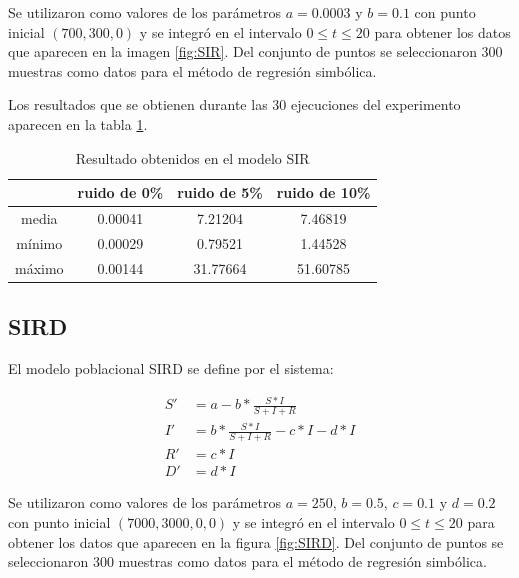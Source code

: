 Se utilizaron como valores de los parámetros $a = 0.0003$ y $b = 0.1$ con punto inicial $(700, 300, 0)$ y se integró en el intervalo $0 \leq t \leq 20$ para obtener los datos que aparecen en la imagen \ref{fig:SIR}. Del conjunto de puntos se seleccionaron 300 muestras como datos para el método de regresión simbólica.

Los resultados que se obtienen durante las 30 ejecuciones del experimento aparecen en la tabla \ref{table:experiment_SIR}.

\begin{table}[!h]
    \centering
    \caption{Resultado obtenidos en el modelo SIR}
    \begin{tabular}{|c|c|c|c|}
        \hline
               & \textbf{ruido de 0\%} & \textbf{ruido de 5\%} & \textbf{ruido de 10\%} \\
        \hline
        media  & 0.00041               & 7.21204               & 7.46819                \\
        \hline
        mínimo & 0.00029               & 0.79521               & 1.44528                \\
        \hline
        máximo & 0.00144               & 31.77664              & 51.60785               \\
        \hline
    \end{tabular}
    \label{table:experiment_SIR}
\end{table}



\subsection{SIRD}

El modelo poblacional SIRD se define por el sistema:

\begin{align*}
    S' & = a - b * \frac{S * I}{S + I + R}             \\
    I' & = b * \frac{S * I}{S + I + R} - c * I - d * I \\
    R' & = c * I                                       \\
    D' & = d * I
\end{align*}

Se utilizaron como valores de los parámetros $a = 250$, $b = 0.5$, $c = 0.1$ y $d = 0.2$ con punto inicial $(7000, 3000, 0, 0)$ y se integró en el intervalo $0 \leq t \leq 20$ para obtener los datos que aparecen en la figura \ref{fig:SIRD}. Del conjunto de puntos se seleccionaron 300 muestras como datos para el método de regresión simbólica.

